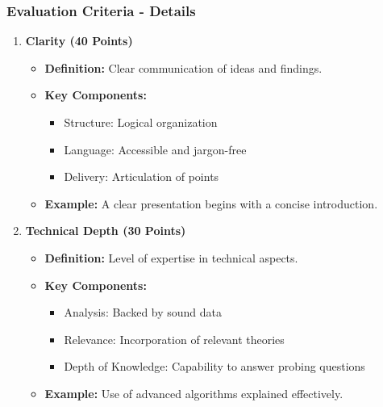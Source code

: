 \documentclass{beamer}
\begin{document}
\begin{frame}[fragile]
    \frametitle{Evaluation Criteria - Details}
    \begin{enumerate}
        \item \textbf{Clarity (40 Points)}
            \begin{itemize}
                \item \textbf{Definition:} Clear communication of ideas and findings.
                \item \textbf{Key Components:}
                    \begin{itemize}
                        \item Structure: Logical organization
                        \item Language: Accessible and jargon-free
                        \item Delivery: Articulation of points
                    \end{itemize}
                \item \textbf{Example:} A clear presentation begins with a concise introduction.
            \end{itemize}
    
        \item \textbf{Technical Depth (30 Points)}
            \begin{itemize}
                \item \textbf{Definition:} Level of expertise in technical aspects.
                \item \textbf{Key Components:}
                    \begin{itemize}
                        \item Analysis: Backed by sound data
                        \item Relevance: Incorporation of relevant theories
                        \item Depth of Knowledge: Capability to answer probing questions
                    \end{itemize}
                \item \textbf{Example:} Use of advanced algorithms explained effectively.
            \end{itemize}
    \end{enumerate}
\end{frame}
\end{document}
